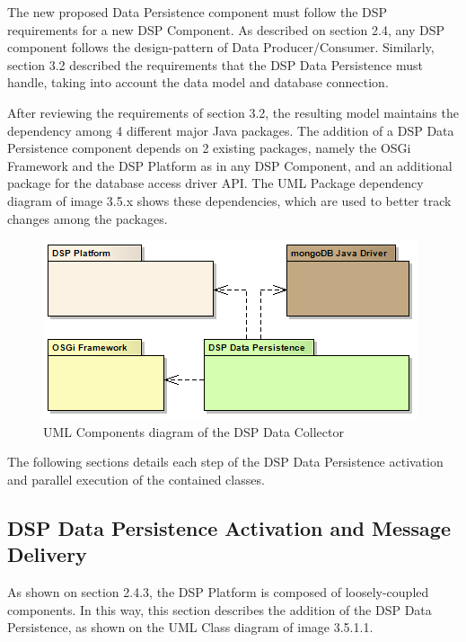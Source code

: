 The new proposed Data Persistence component must follow the DSP requirements
for a new DSP Component. As described on section 2.4, any DSP component follows
the design-pattern of Data Producer/Consumer. Similarly, section 3.2 described
the requirements that the DSP Data Persistence must handle, taking into account
the data model and database connection.

After reviewing the requirements of section 3.2, the resulting model maintains
the dependency among 4 different major Java packages. The addition of a DSP
Data Persistence component depends on 2 existing packages, namely the OSGi
Framework and the DSP Platform as in any DSP Component, and an additional
package for the database access driver API. The UML Package dependency diagram
of image 3.5.x shows these dependencies, which are used to better track changes
among the packages.

\begin{figure}[!h]
  \centering
  \includegraphics[scale=0.5]{../diagrams/DSP-Data-Persistence-Packages-Dependency}
  \caption{UML Components diagram of the DSP Data Collector}
  \label{fig:DSP-Data-Persistence-Packages-Dependency}
\end{figure}

The following sections details each step of the DSP Data Persistence activation
and parallel execution of the contained classes.

\subsection{DSP Data Persistence Activation and Message Delivery}

As shown on section 2.4.3, the DSP Platform is composed of loosely-coupled
components. In this way, this section describes the addition of the DSP Data
Persistence, as shown on the UML Class diagram of image 3.5.1.1.

